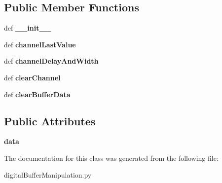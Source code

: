 \subsection*{Public Member Functions}
\begin{DoxyCompactItemize}
\item 
\hypertarget{class_chassis_8git_1_1digital_buffer_manipulation_1_1digital_buffer_manipulation_u16_abfe61c78a6798107abf8b42ac1fdae09}{def {\bfseries \-\_\-\-\_\-init\-\_\-\-\_\-}}\label{class_chassis_8git_1_1digital_buffer_manipulation_1_1digital_buffer_manipulation_u16_abfe61c78a6798107abf8b42ac1fdae09}

\item 
\hypertarget{class_chassis_8git_1_1digital_buffer_manipulation_1_1digital_buffer_manipulation_u16_a8a3e767f744b88d7cf3eb02d5031c4f2}{def {\bfseries channel\-Last\-Value}}\label{class_chassis_8git_1_1digital_buffer_manipulation_1_1digital_buffer_manipulation_u16_a8a3e767f744b88d7cf3eb02d5031c4f2}

\item 
\hypertarget{class_chassis_8git_1_1digital_buffer_manipulation_1_1digital_buffer_manipulation_u16_ae02b2cb46aa273c6139336b8f386de88}{def {\bfseries channel\-Delay\-And\-Width}}\label{class_chassis_8git_1_1digital_buffer_manipulation_1_1digital_buffer_manipulation_u16_ae02b2cb46aa273c6139336b8f386de88}

\item 
\hypertarget{class_chassis_8git_1_1digital_buffer_manipulation_1_1digital_buffer_manipulation_u16_aef0fbdafaac539ddd94e52c0b5d4c999}{def {\bfseries clear\-Channel}}\label{class_chassis_8git_1_1digital_buffer_manipulation_1_1digital_buffer_manipulation_u16_aef0fbdafaac539ddd94e52c0b5d4c999}

\item 
\hypertarget{class_chassis_8git_1_1digital_buffer_manipulation_1_1digital_buffer_manipulation_u16_a8ad2415e266f969dfe64e98c2f7bddbd}{def {\bfseries clear\-Buffer\-Data}}\label{class_chassis_8git_1_1digital_buffer_manipulation_1_1digital_buffer_manipulation_u16_a8ad2415e266f969dfe64e98c2f7bddbd}

\end{DoxyCompactItemize}
\subsection*{Public Attributes}
\begin{DoxyCompactItemize}
\item 
\hypertarget{class_chassis_8git_1_1digital_buffer_manipulation_1_1digital_buffer_manipulation_u16_a12da273481620e72eb4666dc57c5383f}{{\bfseries data}}\label{class_chassis_8git_1_1digital_buffer_manipulation_1_1digital_buffer_manipulation_u16_a12da273481620e72eb4666dc57c5383f}

\end{DoxyCompactItemize}


The documentation for this class was generated from the following file\-:\begin{DoxyCompactItemize}
\item 
digital\-Buffer\-Manipulation.\-py\end{DoxyCompactItemize}
